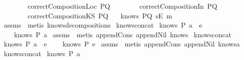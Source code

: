 \begin{isabellebody}
\ \ \ \ \ \ \ \ {\isachardoublequoteopen}correctCompositionLoc\ PQ{\isachardoublequoteclose}\isanewline
\ \ \ \ \ \ \ \ {\isachardoublequoteopen}correctCompositionIn\ PQ{\isachardoublequoteclose}\isanewline
\ \ \ \ \ \ \ \ {\isachardoublequoteopen}correctCompositionKS\ PQ{\isachardoublequoteclose}\ \isanewline
{}\ {\isachardoublequoteopen}{\isasymnot}\ knows\ PQ\ {\isacharbrackleft}sE\ m{\isacharbrackright}{\isachardoublequoteclose}\isanewline
\isadelimproof
\endisadelimproof
\isatagproof
{}\isamarkupfalse \ assms\ \isamarkupfalse \ {\isacharparenleft}metis\ knows{\isacharunderscore}decomposition{\isacharunderscore}{}{\isacharunderscore}s{\isacharparenright}\endisatagproof
{\isafoldproof}\isadelimproof
\isanewline
\endisadelimproof
\isanewline
{}\isamarkupfalse \ knows{\isacharunderscore}concat{\isacharunderscore}{}{\isacharcolon}\isanewline
{}\ {\isachardoublequoteopen}knows\ P\ {\isacharparenleft}a\ {\isacharhash}\ e{\isacharparenright}{\isachardoublequoteclose}\isanewline
{}\ \ \ \ {\isachardoublequoteopen}knows\ P\ {\isacharbrackleft}a{\isacharbrackright}{\isachardoublequoteclose}\isanewline
\isadelimproof
\endisadelimproof
\isatagproof
{}\isamarkupfalse \ assms\ \isamarkupfalse \ {\isacharparenleft}metis\ append{\isacharunderscore}Cons\ append{\isacharunderscore}Nil\ knows{}{\isacharparenright}\endisatagproof
{\isafoldproof}\isadelimproof
\isanewline
\endisadelimproof
\isanewline
{}\isamarkupfalse \ knows{\isacharunderscore}concat{\isacharunderscore}{}{\isacharcolon}\isanewline
{}\ {\isachardoublequoteopen}knows\ P\ {\isacharparenleft}a\ {\isacharhash}\ e{\isacharparenright}{\isachardoublequoteclose}\isanewline
{}\ \ \ \ {\isachardoublequoteopen}knows\ P\ e{\isachardoublequoteclose}\isanewline
\isadelimproof
\endisadelimproof
\isatagproof
{}\isamarkupfalse \ assms\ \isamarkupfalse \ {\isacharparenleft}metis\ append{\isacharunderscore}Cons\ append{\isacharunderscore}Nil\ knows{}a{\isacharparenright}\endisatagproof
{\isafoldproof}\isadelimproof
\isanewline
\endisadelimproof
\isanewline
{}\isamarkupfalse \ knows{\isacharunderscore}concat{\isacharunderscore}{}{\isacharcolon}\isanewline
{}\ {\isachardoublequoteopen}knows\ P\ {\isacharbrackleft}a{\isacharbrackright}{\isachardoublequoteclose}\isanewline

\end{isabellebody}
